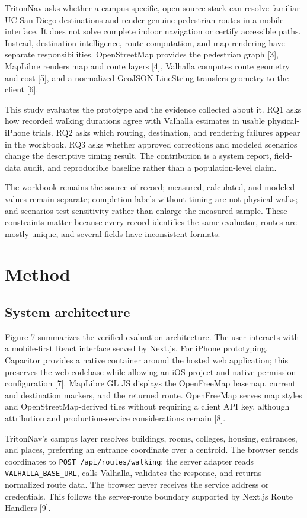\documentclass[9pt,twocolumn]{article}
\begin{document}
TritonNav asks whether a campus-specific, open-source stack can resolve familiar UC San Diego destinations and render genuine pedestrian routes in a mobile interface. It does not solve complete indoor navigation or certify accessible paths. Instead, destination intelligence, route computation, and map rendering have separate responsibilities. OpenStreetMap provides the pedestrian graph [3], MapLibre renders map and route layers [4], Valhalla computes route geometry and cost [5], and a normalized GeoJSON LineString transfers geometry to the client [6].

This study evaluates the prototype and the evidence collected about it. RQ1 asks how recorded walking durations agree with Valhalla estimates in usable physical-iPhone trials. RQ2 asks which routing, destination, and rendering failures appear in the workbook. RQ3 asks whether approved corrections and modeled scenarios change the descriptive timing result. The contribution is a system report, field-data audit, and reproducible baseline rather than a population-level claim.

The workbook remains the source of record; measured, calculated, and modeled values remain separate; completion labels without timing are not physical walks; and scenarios test sensitivity rather than enlarge the measured sample. These constraints matter because every record identifies the same evaluator, routes are mostly unique, and several fields have inconsistent formats.

\section{Method}
\subsection{System architecture}
Figure 7 summarizes the verified evaluation architecture. The user interacts with a mobile-first React interface served by Next.js. For iPhone prototyping, Capacitor provides a native container around the hosted web application; this preserves the web codebase while allowing an iOS project and native permission configuration [7]. MapLibre GL JS displays the OpenFreeMap basemap, current and destination markers, and the returned route. OpenFreeMap serves map styles and OpenStreetMap-derived tiles without requiring a client API key, although attribution and production-service considerations remain [8].

TritonNav's campus layer resolves buildings, rooms, colleges, housing, entrances, and places, preferring an entrance coordinate over a centroid. The browser sends coordinates to \texttt{POST /api/routes/walking}; the server adapter reads \texttt{VALHALLA\_BASE\_URL}, calls Valhalla, validates the response, and returns normalized route data. The browser never receives the service address or credentials. This follows the server-route boundary supported by Next.js Route Handlers [9].
\end{document}
